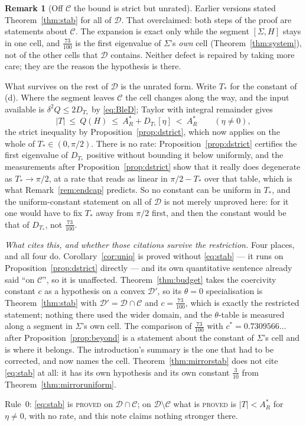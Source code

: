 \documentclass[11pt]{article}
\theoremstyle{definition}
\newtheorem{remark}[theorem]{Remark}
\newcommand{\Sig}{\Sigma}
\begin{document}
\begin{remark}[Off $\mathcal C$ the bound is strict but unrated]\label{rem:v33}
Earlier versions stated Theorem~\ref{thm:stab} for all of $\mathcal D$. That overclaimed:
both steps of the proof are statements about $\mathcal C$. The expansion is exact only while
the segment $[\Sig,H]$ stays in one cell, and $\tfrac{73}{100}$ is the first eigenvalue of
$\Sig$'s \emph{own} cell (Theorem~\ref{thm:system}), not of the other cells that
$\mathcal D$ contains. Neither defect is repaired by taking more care; they are the reason
the hypothesis is there.

What survives on the rest of $\mathcal D$ is the unrated form. Write $T_\ast$ for the
constant of (d). Where the segment leaves $\mathcal C$ the cell changes along the way, and
the input available is $\delta^2Q\le2D_{T_\ast}$ by \eqref{eq:BleD}; Taylor with integral
remainder gives
\[
  |T|\ \le\ Q(H)\ \le\ A_R^\ast+D_{T_\ast}[\eta]\ <\ A_R^\ast\qquad(\eta\ne0),
\]
the strict inequality by Proposition~\ref{prop:dstrict}, which now applies on the whole of
$T_\ast\in(0,\pi/2)$. There is no rate: Proposition~\ref{prop:dstrict} certifies the first
eigenvalue of $D_{T_\ast}$ positive without bounding it below uniformly, and the measurements
after Proposition~\ref{prop:dstrict} show that it really does degenerate as
$T_\ast\to\pi/2$, at a rate that reads as linear in $\pi/2-T_\ast$ over that table, which is
what Remark~\ref{rem:endcap} predicts. So no constant can be uniform in $T_\ast$, and the
uniform-constant statement on all of $\mathcal D$ is not merely unproved here: for it one
would have to fix $T_\ast$ away from $\pi/2$ first, and then the constant would be that of
$D_{T_\ast}$, not $\tfrac{73}{100}$.

\emph{What cites this, and whether those citations survive the restriction.} Four places, and
all four do. Corollary~\ref{cor:uniq} is proved without \eqref{eq:stab} --- it runs on
Proposition~\ref{prop:dstrict} directly --- and its own quantitative sentence already said
``on $\mathcal C$'', so it is unaffected. Theorem~\ref{thm:budget} takes the coercivity
constant $c$ as a hypothesis on a convex $\mathcal D'$, so its $\theta=0$ specialisation is
Theorem~\ref{thm:stab} with $\mathcal D'=\mathcal D\cap\mathcal C$ and $c=\tfrac{73}{100}$,
which is exactly the restricted statement; nothing there used the wider domain, and the
$\theta$-table is measured along a segment in $\Sig$'s own cell. The comparison of
$\tfrac{73}{100}$ with $c^\ast=0.7309566\ldots$ after Proposition~\ref{prop:beyond} is a
statement about the constant of $\Sig$'s cell and is where it belongs. The introduction's
summary is the one that had to be corrected, and now names the cell.
Theorem~\ref{thm:mirrorstab} does not cite \eqref{eq:stab} at all: it has its own hypothesis
and its own constant $\tfrac3{10}$ from Theorem~\ref{thm:mirroruniform}.

Rule~0: \eqref{eq:stab} is \textsc{proved} on $\mathcal D\cap\mathcal C$; on
$\mathcal D\setminus\mathcal C$ what is \textsc{proved} is $|T|<A_R^\ast$ for $\eta\ne0$, with
no rate, and this note claims nothing stronger there.
\end{remark}
\end{document}
